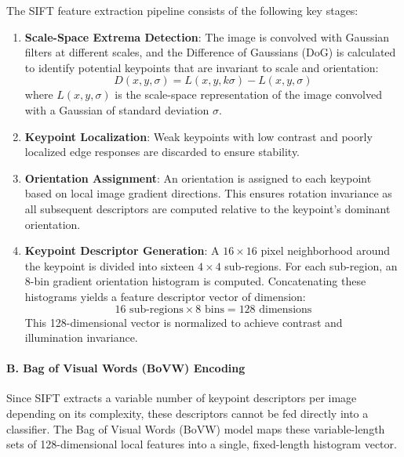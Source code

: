 \documentclass[12pt,a4paper]{article}
\begin{document}
The SIFT feature extraction pipeline consists of the following key stages:
\begin{enumerate}
    \item \textbf{Scale-Space Extrema Detection}: The image is convolved with Gaussian filters at different scales, and the Difference of Gaussians (DoG) is calculated to identify potential keypoints that are invariant to scale and orientation:
    \begin{equation}
        D(x, y, \sigma) = L(x, y, k\sigma) - L(x, y, \sigma)
    \end{equation}
    where $L(x, y, \sigma)$ is the scale-space representation of the image convolved with a Gaussian of standard deviation $\sigma$.
    \item \textbf{Keypoint Localization}: Weak keypoints with low contrast and poorly localized edge responses are discarded to ensure stability.
    \item \textbf{Orientation Assignment}: An orientation is assigned to each keypoint based on local image gradient directions. This ensures rotation invariance as all subsequent descriptors are computed relative to the keypoint's dominant orientation.
    \item \textbf{Keypoint Descriptor Generation}: A $16 \times 16$ pixel neighborhood around the keypoint is divided into sixteen $4 \times 4$ sub-regions. For each sub-region, an 8-bin gradient orientation histogram is computed. Concatenating these histograms yields a feature descriptor vector of dimension:
    \begin{equation}
        16\text{ sub-regions} \times 8\text{ bins} = 128\text{ dimensions}
    \end{equation}
    This 128-dimensional vector is normalized to achieve contrast and illumination invariance.
\end{enumerate}

\paragraph{B. Bag of Visual Words (BoVW) Encoding}
Since SIFT extracts a variable number of keypoint descriptors per image depending on its complexity, these descriptors cannot be fed directly into a classifier. The Bag of Visual Words (BoVW) model maps these variable-length sets of 128-dimensional local features into a single, fixed-length histogram vector.
\end{document}
